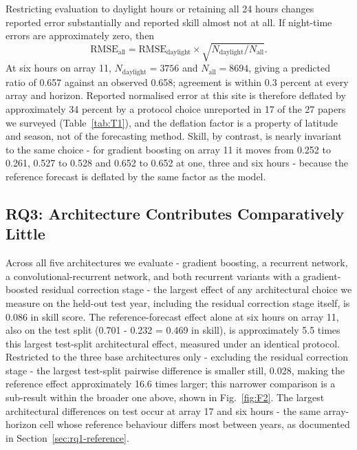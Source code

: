 Restricting evaluation to daylight hours or retaining all 24 hours
changes reported error substantially and reported skill almost not at
all. If night-time errors are approximately zero, then
\begin{equation}
  \text{RMSE}_{\text{all}} = \text{RMSE}_{\text{daylight}} \times
  \sqrt{N_{\text{daylight}} / N_{\text{all}}}.
  \label{eq:closed-form}
\end{equation}
At six hours on array 11, $N_{\text{daylight}} = 3756$ and
$N_{\text{all}} = 8694$, giving a predicted ratio of 0.657 against an
observed 0.658; agreement is within 0.3 percent at every array and
horizon. Reported normalised error at this site is therefore deflated
by approximately 34 percent by a protocol choice unreported in 17 of
the 27 papers we surveyed (Table~\ref{tab:T1}), and the deflation
factor is a property of latitude and season, not of the forecasting
method. Skill, by contrast, is nearly invariant to the same choice -
for gradient boosting on array 11 it moves from 0.252 to 0.261, 0.527
to 0.528 and 0.652 to 0.652 at one, three and six hours - because the
reference forecast is deflated by the same factor as the model.

\subsection{RQ3: Architecture Contributes Comparatively Little}
\label{sec:rq2-architecture}

Across all five architectures we evaluate - gradient boosting, a
recurrent network, a convolutional-recurrent network, and both
recurrent variants with a gradient-boosted residual correction stage -
the largest effect of any architectural choice we measure on the
held-out test year, including the residual correction stage itself, is
0.086 in skill score. The reference-forecast effect alone at six hours
on array 11, also on the test split (0.701 - 0.232 = 0.469 in skill),
is approximately 5.5 times this largest test-split architectural
effect, measured under an identical protocol. Restricted to the three
base architectures only - excluding the residual correction stage -
the largest test-split pairwise difference is smaller still, 0.028,
making the reference effect approximately 16.6 times larger; this
narrower comparison is a sub-result within the broader one above,
shown in Fig.~\ref{fig:F2}. The largest architectural differences on
test occur at array 17 and six hours - the same array-horizon cell
whose reference behaviour differs most between years, as documented in
Section~\ref{sec:rq1-reference}.

